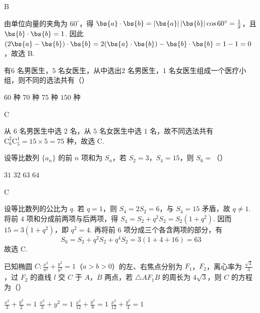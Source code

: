 \begin{answer}
B
\end{answer}

\begin{solution}
由单位向量的夹角为 \(60^\circ\)，得
\(\bs{a}\cdot\bs{b}=|\bs{a}|\,|\bs{b}|\cos60^\circ=\frac{1}{2}\)，且
\(\bs{b}\cdot\bs{b}=1\). 因此
\((2\bs{a}-\bs{b})\cdot\bs{b}=2(\bs{a}\cdot\bs{b})-\bs{b}\cdot\bs{b}=1-1=0\)，故选 B.
\end{solution}

\begin{problem}
有\(6\text{ 名}\)男医生，\(5\text{ 名}\)女医生，从中选出\(2\text{ 名}\)男医生，\(1\text{ 名}\)女医生组成一个医疗小组，则不同的选法共有（\quad）

\choices
    {\(60\text{ 种}\)}
    {\(70\text{ 种}\)}
    {\(75\text{ 种}\)}
    {\(150\text{ 种}\)}
\end{problem}

\begin{answer}
C
\end{answer}

\begin{solution}
从 \(6\) 名男医生中选 \(2\) 名，从 \(5\) 名女医生中选 \(1\) 名，故不同选法共有
\(\mathrm C_6^2\mathrm C_5^1=15\times5=75\) 种，故选 C.
\end{solution}

\begin{problem}
设等比数列 \(\{a_{n}\}\) 的前 \(n\) 项和为 \(S_{n}\)，若 \(S_{2} = 3\)，\(S_{4} = 15\)，则 \(S_{6} =\)（\quad）

\choices
    {\(31\)}
    {\(32\)}
    {\(63\)}
    {\(64\)}
\end{problem}

\begin{answer}
C
\end{answer}

\begin{solution}
设等比数列的公比为 \(q\). 若 \(q=1\)，则 \(S_4=2S_2=6\)，与 \(S_4=15\) 矛盾，故 \(q\ne1\). 将前 \(4\) 项和分成前两项与后两项，得
\(S_4=S_2+q^2S_2=S_2(1+q^2)\). 因而
\(15=3(1+q^2)\)，即 \(q^2=4\). 再将前 \(6\) 项分成三个各含两项的部分，有
\[
S_6=S_2+q^2S_2+q^4S_2=3(1+4+16)=63
\]
故选 C.
\end{solution}

\begin{problem}
已知椭圆 \(C: \frac{x^2}{a^2} + \frac{y^2}{b^2} = 1 \)（\(a > b > 0\)）的左、右焦点分别为 \(F_1\)，\(F_2\)，离心率为 \(\frac{\sqrt{3}}{3}\)，过 \(F_2\) 的直线 \(l\) 交 \(C\) 于 \(A\)，\(B\) 两点，若 \(\triangle AF_{1}B\) 的周长为 \(4\sqrt{3}\)，则 \(C\) 的方程为（\quad）

\choices
    {\(\frac{x^2}{3} +\frac{y^2}{2} = 1\)}
    {\(\frac{x^2}{3} +y^2 = 1\)}
    {\(\frac{x^2}{12} +\frac{y^2}{8} = 1\)}
    {\(\frac{x^2}{12} +\frac{y^2}{4} = 1\)}
\end{problem}


